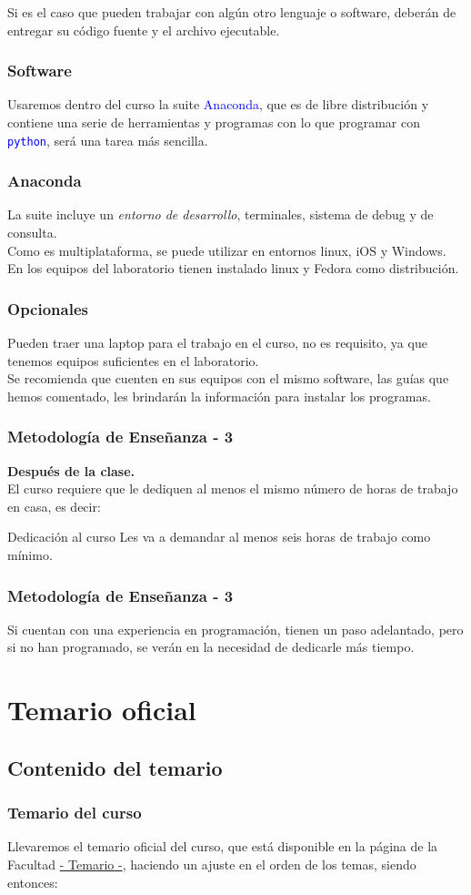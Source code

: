 \documentclass[12pt]{beamer}
\newcommand{\python}{\texttt{python}}
\newcommand{\textoazul}[1]{\textcolor{blue}{#1}}
\begin{document}
\begin{frame}
Si es el caso que pueden trabajar con algún otro lenguaje o software, deberán de entregar su código fuente y el archivo ejecutable.
\end{frame}
\begin{frame}
\frametitle{Software}
Usaremos dentro del curso la suite \textoazul{Anaconda}, que es de libre distribución y contiene una serie de herramientas y programas con lo que programar con \textoazul{\python}, será una tarea más sencilla.
\end{frame}
\begin{frame}
\frametitle{Anaconda}
La suite incluye un \emph{entorno de desarrollo}, terminales, sistema de debug y de consulta.
\\
\bigskip
Como es multiplataforma, se puede utilizar en entornos linux, iOS y Windows. En los equipos del laboratorio tienen instalado linux y Fedora como distribución.
\end{frame}
\begin{frame}
\frametitle{Opcionales}
Pueden traer una laptop para el trabajo en el curso, no es requisito, ya que tenemos equipos suficientes en el laboratorio.
\\
\medskip
Se recomienda que cuenten en sus equipos con el mismo software, las guías que hemos comentado, les brindarán la información para instalar los programas.
\end{frame}
\begin{frame}
\frametitle{Metodología de Enseñanza - 3}
\textbf{Después de la clase.}
\\
\medskip
El curso \alert{requiere que le dediquen al menos el mismo número de horas de trabajo en casa}, es decir:
\pause
\begin{exampleblock}{Dedicación al curso}
Les va a demandar al menos seis horas de trabajo como mínimo.
\end{exampleblock}
\end{frame}
\begin{frame}
\frametitle{Metodología de Enseñanza - 3}
Si cuentan con una experiencia en programación, tienen un paso adelantado, pero si no han programado, se verán en la necesidad de dedicarle más tiempo.
\end{frame}
\section{Temario oficial}
\subsection{Contenido del temario}
\begin{frame}
\frametitle{Temario del curso}
Llevaremos el temario oficial del curso, que está disponible en la página de la Facultad \href{http://www.fciencias.unam.mx/asignaturas/715.pdf}{- Temario -}, haciendo un ajuste en el orden de los temas, siendo entonces:
\end{frame}
\end{document}
